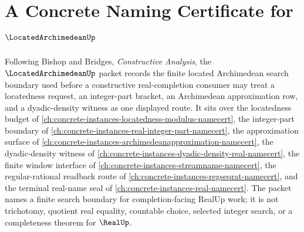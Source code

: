 \chapter{A Concrete Naming Certificate for $\LocatedArchimedeanUp$}
\label{ch:concrete-instances-located-archimedean-namecert}

Following Bishop and Bridges, \emph{Constructive Analysis}, the $\LocatedArchimedeanUp$ packet records the finite located Archimedean search boundary used before a constructive real-completion consumer may treat a locatedness request, an integer-part bracket, an Archimedean approximation row, and a dyadic-density witness as one displayed route. It sits over the locatedness budget of \autoref{ch:concrete-instances-locatedness-modulus-namecert}, the integer-part boundary of \autoref{ch:concrete-instances-real-integer-part-namecert}, the approximation surface of \autoref{ch:concrete-instances-archimedeanapproximation-namecert}, the dyadic-density witness of \autoref{ch:concrete-instances-dyadic-density-real-namecert}, the finite window interface of \autoref{ch:concrete-instances-streamname-namecert}, the regular-rational readback route of \autoref{ch:concrete-instances-regseqrat-namecert}, and the terminal real-name seal of \autoref{ch:concrete-instances-real-namecert}. The packet names a finite search boundary for completion-facing RealUp work; it is not trichotomy, quotient real equality, countable choice, selected integer search, or a completeness theorem for $\RealUp$.

